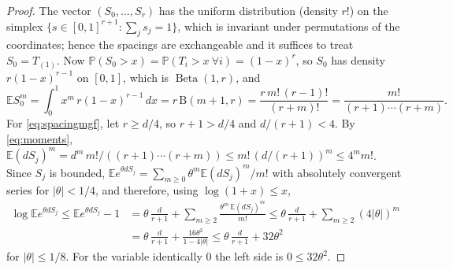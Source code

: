 \documentclass[11pt,a4paper]{article}
\theoremstyle{plain}
\theoremstyle{definition}
\theoremstyle{remark}
\newcommand{\EE}{\mathbb E}
\newcommand{\PP}{\mathbb P}
\newcommand{\Beta}{\operatorname{Beta}}
\begin{document}
\label{pf:spacing}
\lemspacing*
\begin{proof}
The vector $(S_0,\dots,S_r)$ has the uniform distribution (density $r!$) on the simplex $\{s\in[0,1]^{r+1}:\sum_j s_j=1\}$, which is invariant under permutations of the coordinates; hence the spacings are exchangeable and it suffices to treat $S_0=T_{(1)}$. Now $\PP(S_0>x)=\PP(T_i>x\ \forall i)=(1-x)^r$, so $S_0$ has density $r(1-x)^{r-1}$ on $[0,1]$, which is $\Beta(1,r)$, and
\[
 \EE S_0^m=\int_0^1x^m\,r(1-x)^{r-1}\,dx=r\,\mathrm B(m+1,r)=\frac{r\,m!\,(r-1)!}{(r+m)!}=\frac{m!}{(r+1)\cdots(r+m)}.
\]
For \eqref{eq:spacingmgf}, let $r\ge d/4$, so $r+1>d/4$ and $d/(r+1)<4$. By \eqref{eq:moments}, $\EE(dS_j)^m=d^m\,m!/((r+1)\cdots(r+m))\le m!\,(d/(r+1))^m\le4^m m!$. Since $S_j$ is bounded, $\EE e^{\theta dS_j}=\sum_{m\ge0}\theta^m\EE(dS_j)^m/m!$ with absolutely convergent series for $|\theta|<1/4$, and therefore, using $\log(1+x)\le x$,
\begin{align*}
 \log\EE e^{\theta dS_j}\le\EE e^{\theta dS_j}-1
 &=\theta\,\frac d{r+1}+\sum_{m\ge2}\frac{\theta^m\,\EE(dS_j)^m}{m!}
 \le\theta\,\frac d{r+1}+\sum_{m\ge2}(4|\theta|)^m\\
 &=\theta\,\frac d{r+1}+\frac{16\theta^2}{1-4|\theta|}\le\theta\,\frac d{r+1}+32\theta^2
\end{align*}
for $|\theta|\le1/8$. For the variable identically $0$ the left side is $0\le32\theta^2$.
\end{proof}
\end{document}
